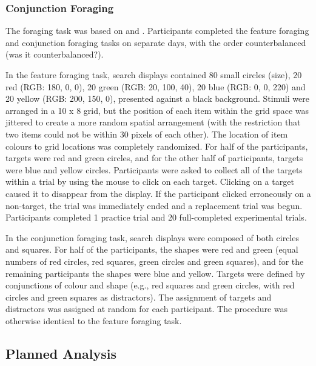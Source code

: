 \documentclass[]{rsos}%
\begin{document}
\subsubsection{Conjunction Foraging}

The foraging task was based on \cite{kristjansson2014} and \cite{johannesson2016}. Participants completed the feature foraging and conjunction foraging tasks on separate days, with the order counterbalanced (was it counterbalanced?).

In the feature foraging task, search displays contained 80 small circles (size), 20 red (RGB: 180, 0, 0), 20 green (RGB: 20, 100, 40), 20 blue (RGB: 0, 0, 220) and 20 yellow (RGB: 200, 150, 0), presented against a black background. Stimuli were arranged in a 10 x 8 grid, but the position of each item within the grid space was jittered to create a more random spatial arrangement (with the restriction that two items could not be within 30 pixels of each other). The location of item colours to grid locations was completely randomized. 
For half of the participants, targets were red and green circles, and for the other half of participants, targets were blue and yellow circles. Participants were asked to collect all of the targets within a trial by using the mouse to click on each target. Clicking on a target caused it to disappear from the display. If the participant clicked erroneously on a non-target, the trial was immediately ended and a replacement trial was begun. Participants completed 1 practice trial and 20 full-completed experimental trials.

In the conjunction foraging task, search displays were composed of both circles and squares. For half of the participants, the shapes were red and green (equal numbers of red circles, red squares, green circles and green squares), and for the remaining participants the shapes were blue and yellow. Targets were defined by conjunctions of colour and shape (e.g., red squares and green circles, with red circles and green squares as distractors). The assignment of targets and distractors was assigned at random for each participant. The procedure was otherwise identical to the feature foraging task. 

\subsection{Planned Analysis}
\end{document}
